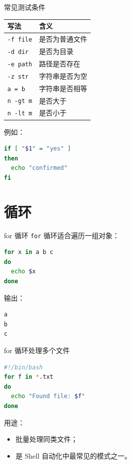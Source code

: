 \documentclass[aspectratio=169]{beamer}
\begin{document}
\begin{frame}[fragile]{常见测试条件}
\begin{center}
\begin{tabular}{ll}
\toprule
写法 & 含义 \\
\midrule
\texttt{-f file} & 是否为普通文件 \\
\texttt{-d dir} & 是否为目录 \\
\texttt{-e path} & 路径是否存在 \\
\texttt{-z str} & 字符串是否为空 \\
\texttt{a = b} & 字符串是否相等 \\
\texttt{n -gt m} & 是否大于 \\
\texttt{n -lt m} & 是否小于 \\
\bottomrule
\end{tabular}
\end{center}

例如：
\begin{lstlisting}[language=bash]
if [ "$1" = "yes" ]
then
  echo "confirmed"
fi
\end{lstlisting}
\end{frame}

\section{循环}

\begin{frame}[fragile]{for 循环}
\texttt{for} 循环适合遍历一组对象：

\begin{lstlisting}[language=bash]
for x in a b c
do
  echo $x
done
\end{lstlisting}

输出：
\begin{lstlisting}[language=bash]
a
b
c
\end{lstlisting}
\end{frame}

\begin{frame}[fragile]{for 循环处理多个文件}
\begin{lstlisting}[language=bash]
#!/bin/bash
for f in *.txt
do
  echo "Found file: $f"
done
\end{lstlisting}

用途：
\begin{itemize}
  \item 批量处理同类文件；
  \item 是 Shell 自动化中最常见的模式之一。
\end{itemize}
\end{frame}
\end{document}
